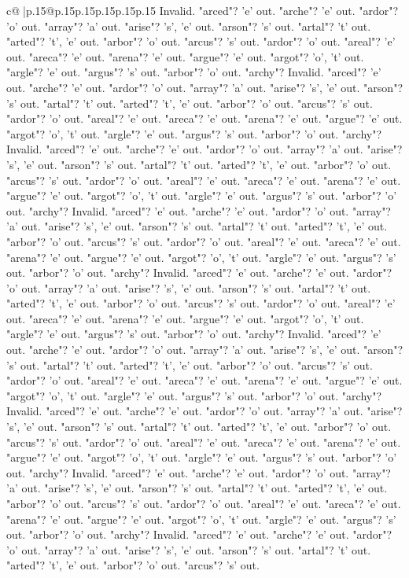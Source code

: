 \documentclass{article}
\begin{document}
{\begin{supertabular}{c@{$\;$}|p{.15\linewidth}@{}p{.15\linewidth}p{.15\linewidth}p{.15\linewidth}p{.15\linewidth}p{.15\linewidth}}
{{{Invalid. "arced"? 'e' out. "arche"? 'e' out. "ardor"? 'o' out. "array"? 'a' out. "arise"? 's', 'e' out. "arson"? 's' out. "artal"? 't' out. "arted"? 't', 'e' out. "arbor"? 'o' out. "arcus"? 's' out. "ardor"? 'o' out. "areal"? 'e' out. "areca"? 'e' out. "arena"? 'e' out. "argue"? 'e' out. "argot"? 'o', 't' out. "argle"? 'e' out. "argus"? 's' out. "arbor"? 'o' out. "archy"? Invalid. "arced"? 'e' out. "arche"? 'e' out. "ardor"? 'o' out. "array"? 'a' out. "arise"? 's', 'e' out. "arson"? 's' out. "artal"? 't' out. "arted"? 't', 'e' out. "arbor"? 'o' out. "arcus"? 's' out. "ardor"? 'o' out. "areal"? 'e' out. "areca"? 'e' out. "arena"? 'e' out. "argue"? 'e' out. "argot"? 'o', 't' out. "argle"? 'e' out. "argus"? 's' out. "arbor"? 'o' out. "archy"? Invalid. "arced"? 'e' out. "arche"? 'e' out. "ardor"? 'o' out. "array"? 'a' out. "arise"? 's', 'e' out. "arson"? 's' out. "artal"? 't' out. "arted"? 't', 'e' out. "arbor"? 'o' out. "arcus"? 's' out. "ardor"? 'o' out. "areal"? 'e' out. "areca"? 'e' out. "arena"? 'e' out. "argue"? 'e' out. "argot"? 'o', 't' out. "argle"? 'e' out. "argus"? 's' out. "arbor"? 'o' out. "archy"? Invalid. "arced"? 'e' out. "arche"? 'e' out. "ardor"? 'o' out. "array"? 'a' out. "arise"? 's', 'e' out. "arson"? 's' out. "artal"? 't' out. "arted"? 't', 'e' out. "arbor"? 'o' out. "arcus"? 's' out. "ardor"? 'o' out. "areal"? 'e' out. "areca"? 'e' out. "arena"? 'e' out. "argue"? 'e' out. "argot"? 'o', 't' out. "argle"? 'e' out. "argus"? 's' out. "arbor"? 'o' out. "archy"? Invalid. "arced"? 'e' out. "arche"? 'e' out. "ardor"? 'o' out. "array"? 'a' out. "arise"? 's', 'e' out. "arson"? 's' out. "artal"? 't' out. "arted"? 't', 'e' out. "arbor"? 'o' out. "arcus"? 's' out. "ardor"? 'o' out. "areal"? 'e' out. "areca"? 'e' out. "arena"? 'e' out. "argue"? 'e' out. "argot"? 'o', 't' out. "argle"? 'e' out. "argus"? 's' out. "arbor"? 'o' out. "archy"? Invalid. "arced"? 'e' out. "arche"? 'e' out. "ardor"? 'o' out. "array"? 'a' out. "arise"? 's', 'e' out. "arson"? 's' out. "artal"? 't' out. "arted"? 't', 'e' out. "arbor"? 'o' out. "arcus"? 's' out. "ardor"? 'o' out. "areal"? 'e' out. "areca"? 'e' out. "arena"? 'e' out. "argue"? 'e' out. "argot"? 'o', 't' out. "argle"? 'e' out. "argus"? 's' out. "arbor"? 'o' out. "archy"? Invalid. "arced"? 'e' out. "arche"? 'e' out. "ardor"? 'o' out. "array"? 'a' out. "arise"? 's', 'e' out. "arson"? 's' out. "artal"? 't' out. "arted"? 't', 'e' out. "arbor"? 'o' out. "arcus"? 's' out. "ardor"? 'o' out. "areal"? 'e' out. "areca"? 'e' out. "arena"? 'e' out. "argue"? 'e' out. "argot"? 'o', 't' out. "argle"? 'e' out. "argus"? 's' out. "arbor"? 'o' out. "archy"? Invalid. "arced"? 'e' out. "arche"? 'e' out. "ardor"? 'o' out. "array"? 'a' out. "arise"? 's', 'e' out. "arson"? 's' out. "artal"? 't' out. "arted"? 't', 'e' out. "arbor"? 'o' out. "arcus"? 's' out. "ardor"? 'o' out. "areal"? 'e' out. "areca"? 'e' out. "arena"? 'e' out. "argue"? 'e' out. "argot"? 'o', 't' out. "argle"? 'e' out. "argus"? 's' out. "arbor"? 'o' out. "archy"? Invalid. "arced"? 'e' out. "arche"? 'e' out. "ardor"? 'o' out. "array"? 'a' out. "arise"? 's', 'e' out. "arson"? 's' out. "artal"? 't' out. "arted"? 't', 'e' out. "arbor"? 'o' out. "arcus"? 's' out. }}}
\end{supertabular}}
\end{document}
